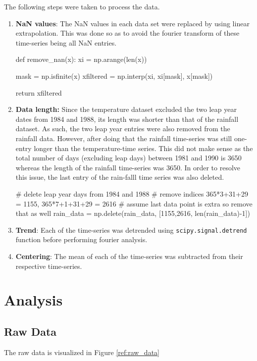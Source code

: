 \documentclass{article}
\begin{document}
The following steps were taken to process the data. 
\begin{enumerate}
	\item \textbf{NaN values}: The NaN values in each data set were replaced by using linear extrapolation. This was done so as to avoid the fourier transform of these time-series being all NaN entries.
	\begin{python}
		def remove_nan(x):
		xi = np.arange(len(x))
		
		mask = np.isfinite(x)
		xfiltered = np.interp(xi, xi[mask], x[mask])
		
		return xfiltered
	\end{python}

	\item \textbf{Data length:} Since the temperature dataset excluded the two leap year dates from 1984 and 1988, its length was shorter than that of the rainfall dataset. As such, the two leap year entries were also removed from the rainfall data. However, after doing that the rainfall time-series was still one-entry longer than the temperature-time series. This did not make sense as the total number of days (excluding leap days) between 1981 and 1990 is 3650 whereas the length of the rainfall time-series was 3650. In order to resolve this issue, the last entry of the rain-falll time series was also deleted. 
	
	\begin{python}
	  # delete leap year days from 1984 and 1988
		# remove indices 365*3+31+29 = 1155, 365*7+1+31+29 = 2616
		# assume last data point is extra so remove that as well
		rain_data = np.delete(rain_data, [1155,2616, len(rain_data)-1])
	\end{python}

	\item \textbf{Trend}: Each of the time-series was detrended using \texttt{scipy.signal.detrend} function before performing fourier analysis.
	
	\item \textbf{Centering}: The mean of each of the time-series was subtracted from their respective time-series.
	
\end{enumerate}


\newpage
\section{Analysis}

\subsection{Raw Data}
The raw data is visualized in Figure \ref{ref:raw_data}
\end{document}
